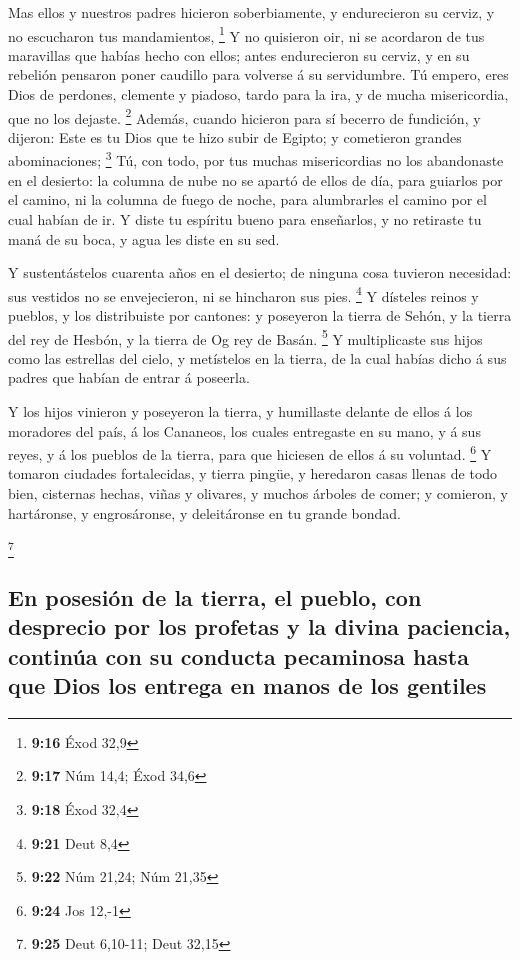  Mas ellos y nuestros padres hicieron soberbiamente, y
endurecieron su cerviz, y no escucharon tus mandamientos, \footnote{\textbf{9:16}
  Éxod 32,9}  Y no quisieron oir, ni se acordaron de tus
maravillas que habías hecho con ellos; antes endurecieron su cerviz, y
en su rebelión pensaron poner caudillo para volverse á su servidumbre.
Tú empero, eres Dios de perdones, clemente y piadoso, tardo para la ira,
y de mucha misericordia, que no los dejaste. \footnote{\textbf{9:17} Núm
  14,4; Éxod 34,6}  Además, cuando hicieron para sí
becerro de fundición, y dijeron: Este es tu Dios que te hizo subir de
Egipto; y cometieron grandes abominaciones; \footnote{\textbf{9:18} Éxod
  32,4}  Tú, con todo, por tus muchas misericordias no
los abandonaste en el desierto: la columna de nube no se apartó de ellos
de día, para guiarlos por el camino, ni la columna de fuego de noche,
para alumbrarles el camino por el cual habían de ir.  Y
diste tu espíritu bueno para enseñarlos, y no retiraste tu maná de su
boca, y agua les diste en su sed.

 Y sustentástelos cuarenta años en el desierto; de
ninguna cosa tuvieron necesidad: sus vestidos no se envejecieron, ni se
hincharon sus pies. \footnote{\textbf{9:21} Deut 8,4}  Y
dísteles reinos y pueblos, y los distribuiste por cantones: y poseyeron
la tierra de Sehón, y la tierra del rey de Hesbón, y la tierra de Og rey
de Basán. \footnote{\textbf{9:22} Núm 21,24; Núm 21,35} 
Y multiplicaste sus hijos como las estrellas del cielo, y metístelos en
la tierra, de la cual habías dicho á sus padres que habían de entrar á
poseerla.

 Y los hijos vinieron y poseyeron la tierra, y humillaste
delante de ellos á los moradores del país, á los Cananeos, los cuales
entregaste en su mano, y á sus reyes, y á los pueblos de la tierra, para
que hiciesen de ellos á su voluntad. \footnote{\textbf{9:24} Jos 12,-1}
 Y tomaron ciudades fortalecidas, y tierra pingüe, y
heredaron casas llenas de todo bien, cisternas hechas, viñas y olivares,
y muchos árboles de comer; y comieron, y hartáronse, y engrosáronse, y
deleitáronse en tu grande bondad.

\footnote{\textbf{9:25} Deut 6,10-11; Deut 32,15}

\hypertarget{en-posesiuxf3n-de-la-tierra-el-pueblo-con-desprecio-por-los-profetas-y-la-divina-paciencia-continuxfaa-con-su-conducta-pecaminosa-hasta-que-dios-los-entrega-en-manos-de-los-gentiles}{%
\subsection{En posesión de la tierra, el pueblo, con desprecio por los
profetas y la divina paciencia, continúa con su conducta pecaminosa
hasta que Dios los entrega en manos de los
gentiles}\label{en-posesiuxf3n-de-la-tierra-el-pueblo-con-desprecio-por-los-profetas-y-la-divina-paciencia-continuxfaa-con-su-conducta-pecaminosa-hasta-que-dios-los-entrega-en-manos-de-los-gentiles}}

